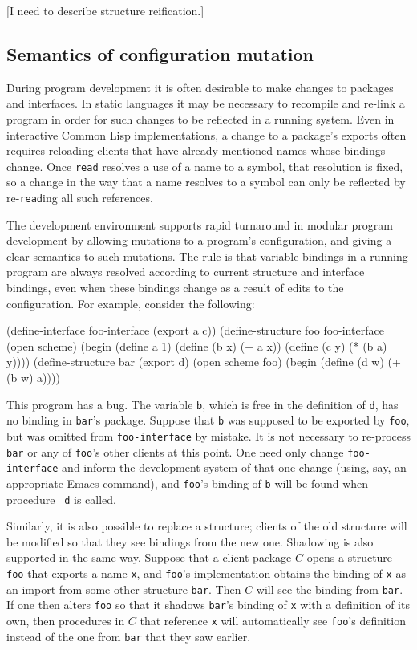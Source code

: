 [I need to describe structure reification.]


\subsection*{Semantics of configuration mutation}

During program development it is often desirable to make changes to
packages and interfaces.  In static languages it may be necessary to
recompile and re-link a program in order for such changes to be
reflected in a running system.  Even in interactive Common Lisp
implementations, a change to a package's exports often requires
reloading clients that have already mentioned names whose bindings
change.  Once {\tt read} resolves a use of a name to a symbol, that
resolution is fixed, so a change in the way that a name resolves to a
symbol can only be reflected by re-{\tt read}ing all such references.

The \hack{} development environment supports rapid turnaround in
modular program development by allowing mutations to a program's
configuration, and giving a clear semantics to such mutations.  The
rule is that variable bindings in a running program are always
resolved according to current structure and interface bindings, even
when these bindings change as a result of edits to the configuration.
For example, consider the following:
\begin{code}
    (define-interface foo-interface (export a c))
    (define-structure foo foo-interface
      (open scheme)
      (begin (define a 1)
	     (define (b x) (+ a x))
	     (define (c y) (* (b a) y))))
    (define-structure bar (export d)
      (open scheme foo)
      (begin (define (d w) (+ (b w) a))))
\end{code}
This program has a bug.  The variable {\tt b}, which is free in the
definition of {\tt d}, has no binding in {\tt bar}'s package.  Suppose
that {\tt b} was supposed to be exported by {\tt foo}, but was omitted
from {\tt foo-interface} by mistake.  It is not necessary to
re-process {\tt bar} or any of {\tt foo}'s other clients at this point.
One need only change {\tt foo-interface} and inform the development
system of that one change (using, say, an appropriate Emacs command),
and {\tt foo}'s binding of {\tt b} will be found when procedure {\tt
d} is called.

Similarly, it is also possible to replace a structure; clients of the
old structure will be modified so that they see bindings from the new
one.  Shadowing is also supported in the same way.  Suppose that a
client package $C$ opens a structure {\tt foo} that exports a name
{\tt x}, and {\tt foo}'s implementation obtains the binding of {\tt x}
as an import from some other structure {\tt bar}.  Then $C$ will see
the binding from {\tt bar}.  If one then alters {\tt foo} so that it
shadows {\tt bar}'s binding of {\tt x} with a definition of its own,
then procedures in $C$ that reference {\tt x} will automatically see
{\tt foo}'s definition instead of the one from {\tt bar} that they saw
earlier.

